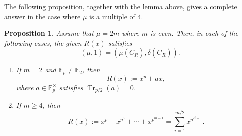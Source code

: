 \documentclass[12pt,a4paper]{amsart}
\newtheorem{proposition}[theorem]{Proposition}
\theoremstyle{definition}
\def\F{{\mathbb F}}
\theoremstyle{remark}
\DeclareMathOperator{\Tr}{Tr}
\begin{document}
The following proposition, together with the lemma above, gives a complete answer in the case where $\mu$ is a multiple of $4$. 
\begin{proposition} \label{not well known case for period}
Assume that $\mu=2m$ where $m$ is even. Then, in each of the following cases, the given $R(x)$ satisfies 
\[
(\mu,1)=(\mu(\overline{C}_R),\delta(\overline{C}_R)). 
\]
\begin{enumerate}
    \item If $m=2$ and $\F_p\neq\F_2$, then 
    \[
    R(x):=x^p+ax, 
    \]
    where $a\in \F_p^\times$ satisfies $\Tr_{p/2}(a)=0$. 
\item If $m\geq4$, then 
    \[
R(x):=x^p+x^{p^3}+\cdots+x^{p^{m-1}}=\sum_{i=1}^{m/2}x^{p^{2i-1}}. 
\]
\end{enumerate}
\end{proposition}
\end{document}
